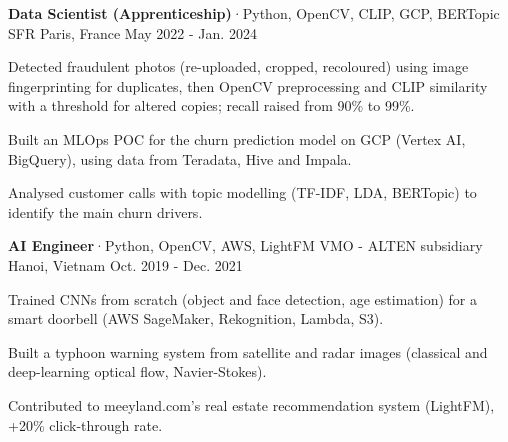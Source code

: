 \begin{cventries}
  \cventry
    {\textbf{Data Scientist (Apprenticeship)}{\enskip·\enskip}{\fontsize{7.5pt}{1em}\selectfont Python, OpenCV, CLIP, GCP, BERTopic}} %
    {SFR} %
    {Paris, France} %
    {May 2022 - Jan. 2024} %
    {
      \begin{cvitems} %
        \item {Detected fraudulent photos (re-uploaded, cropped, recoloured) using image fingerprinting for duplicates, then OpenCV preprocessing and CLIP similarity with a threshold for altered copies; recall raised from 90\% to 99\%.}
        \item {Built an MLOps POC for the churn prediction model on GCP (Vertex AI, BigQuery), using data from Teradata, Hive and Impala.}
        \item {Analysed customer calls with topic modelling (TF-IDF, LDA, BERTopic) to identify the main churn drivers.}
      \end{cvitems}
    }

  \cventry
    {\textbf{AI Engineer}{\enskip·\enskip}{\fontsize{7.5pt}{1em}\selectfont Python, OpenCV, AWS, LightFM}} %
    {VMO - ALTEN subsidiary} %
    {Hanoi, Vietnam} %
    {Oct. 2019 - Dec. 2021} %
    {
      \begin{cvitems} %
        \item {Trained CNNs from scratch (object and face detection, age estimation) for a smart doorbell (AWS SageMaker, Rekognition, Lambda, S3).}
        \item {Built a typhoon warning system from satellite and radar images (classical and deep-learning optical flow, Navier-Stokes).}
        \item {Contributed to meeyland.com’s real estate recommendation system (LightFM), +20\% click-through rate.}
      \end{cvitems}
    }

\end{cventries}
